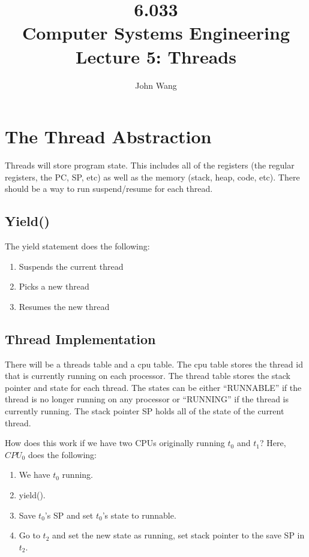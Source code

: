 \documentclass[psamsfonts]{amsart}
\title{6.033 \\
Computer Systems Engineering \\
Lecture 5: Threads}
\author{John Wang}
\begin{document}
\maketitle

\section{The Thread Abstraction}

Threads will store program state. This includes all of the registers (the regular registers, the PC, SP, etc) as well as the memory (stack, heap, code, etc). There should be a way to run suspend/resume for each thread.

\subsection{Yield()}

The yield statement does the following:
\begin{enumerate}
  \item Suspends the current thread
  \item Picks a new thread
  \item Resumes the new thread
\end{enumerate}

\subsection{Thread Implementation}

There will be a threads table and a cpu table. The cpu table stores the thread id that is currently running on each processor. The thread table stores the stack pointer and state for each thread. The states can be either ``RUNNABLE'' if the thread is no longer running on any processor or ``RUNNING'' if the thread is currently running. The stack pointer SP holds all of the state of the current thread.

How does this work if we have two CPUs originally running $t_0$ and $t_1$? Here, $CPU_0$ does the following:
\begin{enumerate}
  \item We have $t_0$ running.
  \item yield().
  \item Save $t_0$'s SP and set $t_0$'s state to runnable.
  \item Go to $t_2$ and set the new state as running, set stack pointer to the save SP in $t_2$.
\end{enumerate}
\end{document}
